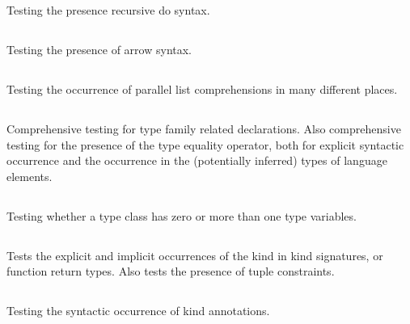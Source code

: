 \documentclass[main.tex]{subfiles}
\begin{document}
	Testing the presence recursive do syntax.
	
	\subsection{}
	
	Testing the presence of arrow syntax.
	
	\subsection{}
	
	Testing the occurrence of parallel list comprehensions in many different places.
	
	\subsection{}
	
	Comprehensive testing for type family related declarations. Also comprehensive testing for the presence of the type equality operator, both for explicit syntactic occurrence and the occurrence in the (potentially inferred) types of language elements.
	
	\subsection{}
	
	Testing whether a type class has zero or more than one type variables.
	
	\subsection{}
	
	Tests the explicit and implicit occurrences of the kind  in kind signatures, or function return types. Also tests the presence of tuple constraints.
	
	\subsection{}
	
	Testing the syntactic occurrence of kind annotations.
	
	\subsection{}
	
\end{document}
